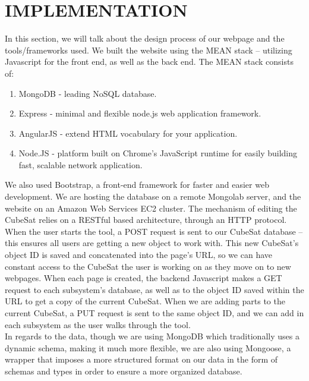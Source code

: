 \documentclass[a4, 12 pt]{article} %
\begin{document}
\section{IMPLEMENTATION}
In this section, we will talk about the design process of our webpage and the tools/frameworks used. We built the website using the MEAN stack -- utilizing Javascript for the front end, as well as the back end. The MEAN stack consists of:
\begin{enumerate}
\item MongoDB -  leading NoSQL database.
\item Express - minimal and flexible node.js web application framework.
\item AngularJS - extend HTML vocabulary for your application. 
\item Node.JS - platform built on Chrome's JavaScript runtime for easily building fast, scalable network application.\end{enumerate}
We also used Bootstrap, a front-end framework for faster and easier web development. We are hosting the database on a remote Mongolab server, and the website on an Amazon Web Services EC2 cluster. The mechanism of editing the CubeSat relies on a RESTful based architecture, through an HTTP protocol. When the user starts the tool, a POST request is sent to our CubeSat database -- this ensures all users are getting a new object to work with. This new CubeSat's object ID is saved and concatenated into the page's URL, so we can have constant access to the CubeSat the user is working on as they move on to new webpages. When each page is created, the backend Javascript makes a GET request to each subsystem's database, as well as to the object ID saved within the URL to get a copy of the current CubeSat. When we are adding parts to the current CubeSat, a PUT request is sent to the same object ID, and we can add in each subsystem as the user walks through the tool.\\[2mm]
In regards to the data, though we are using MongoDB which traditionally uses a dynamic schema, making it much more flexible, we are also using Mongoose, a wrapper that imposes a more structured format on our data in the form of schemas and types in order to ensure a more organized database.  
\end{document}
